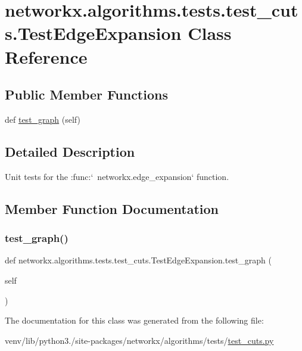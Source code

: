 \hypertarget{classnetworkx_1_1algorithms_1_1tests_1_1test__cuts_1_1TestEdgeExpansion}{}\section{networkx.\+algorithms.\+tests.\+test\+\_\+cuts.\+Test\+Edge\+Expansion Class Reference}
\label{classnetworkx_1_1algorithms_1_1tests_1_1test__cuts_1_1TestEdgeExpansion}
\subsection*{Public Member Functions}
\begin{DoxyCompactItemize}
\item 
def \hyperlink{classnetworkx_1_1algorithms_1_1tests_1_1test__cuts_1_1TestEdgeExpansion_a354400976a63b110baaf501d2d64059f}{test\+\_\+graph} (self)
\end{DoxyCompactItemize}


\subsection{Detailed Description}
\begin{DoxyVerb}Unit tests for the :func:`~networkx.edge_expansion` function.\end{DoxyVerb}
 

\subsection{Member Function Documentation}
\mbox{\label{classnetworkx_1_1algorithms_1_1tests_1_1test__cuts_1_1TestEdgeExpansion_a354400976a63b110baaf501d2d64059f}} 
\subsubsection{\texorpdfstring{test\+\_\+graph()}{test\_graph()}}
{\footnotesize\ttfamily def networkx.\+algorithms.\+tests.\+test\+\_\+cuts.\+Test\+Edge\+Expansion.\+test\+\_\+graph (\begin{DoxyParamCaption}\item[{}]{self }\end{DoxyParamCaption})}



The documentation for this class was generated from the following file\+:\begin{DoxyCompactItemize}
\item 
venv/lib/python3./site-\/packages/networkx/algorithms/tests/\hyperlink{tests_2test__cuts_8py}{test\+\_\+cuts.\+py}\end{DoxyCompactItemize}
